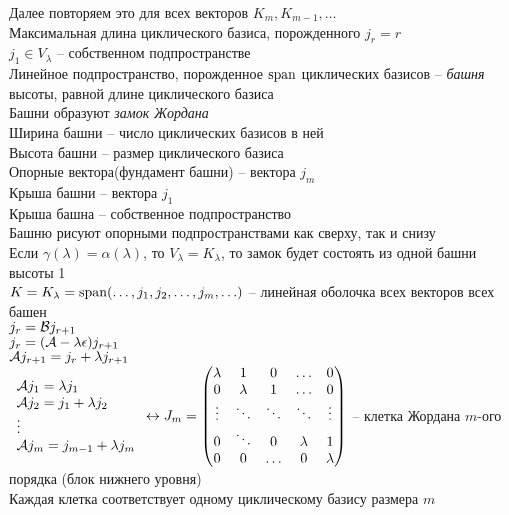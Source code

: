 \documentclass[12pt]{article}
\begin{document}
Далее повторяем это для всех векторов $K_m, K_{m-1}, \ldots$\\
Максимальная длина циклического базиса, порожденного $j_r = r$\\
$j_1 \in V_\lambda$ -- собственном подпространстве\\
Линейное подпространство, порожденное $\operatorname{span}$ циклических базисов -- \textit{башня} высоты, равной длине циклического базиса\\
Башни образуют \textit{замок Жордана}\\
Ширина башни -- число циклических базисов в ней\\
Высота башни -- размер циклического базиса\\
Опорные вектора(фундамент башни) -- вектора $j_m$\\
Крыша башни -- вектора $j_1$\\
Крыша башна -- собственное подпространство\\
Башню рисуют опорными подпространствами как сверху, так и снизу\\
Если $\gamma(\lambda) = \alpha(\lambda)$, то $V_\lambda = K_\lambda$, то замок будет состоять из одной башни высоты 1\\
$K = K_\lambda = \operatorname{span} (\ldots, j_1, j_2, \ldots, j_m, \ldots)$ -- линейная оболочка всех векторов всех башен\\
$j_r = \mathcal{B} j_{r+1}$\\
$j_r = (\mathcal{A} - \lambda \epsilon)j_{r+1}$\\
$\mathcal{A} j_{r+1} = j_r + \lambda j_{r+1}$\\
$\begin{array}{l}
     \mathcal{A} j_1 = \lambda j_1\\
     \mathcal{A} j_2 = j_1 + \lambda j_2\\
     \vdots\\
     \mathcal{A} j_m = j_{m-1} + \lambda j_m
\end{array} \leftrightarrow J_m = \begin{pmatrix}
    \lambda & 1 & 0 & \ldots & 0\\
    0 & \lambda & 1 & \ldots & 0\\
    \vdots & \ddots & \ddots & \ddots & \vdots\\
    0 & \ddots & 0 & \lambda & 1\\
    0 & 0 & \ldots & 0 & \lambda
\end{pmatrix}$ -- клетка Жордана $m$-ого порядка (блок нижнего уровня)\\
Каждая клетка соответствует одному циклическому базису размера $m$\\
\end{document}
